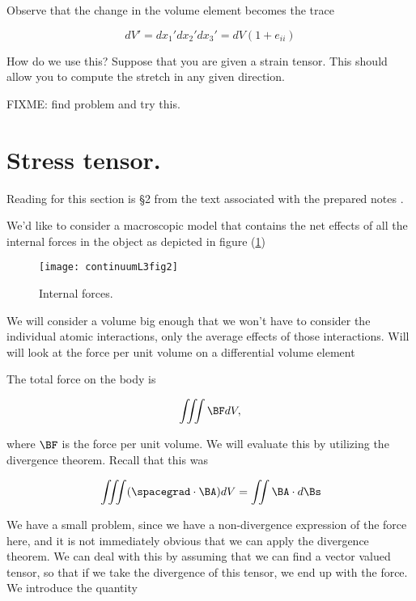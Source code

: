 Observe that the change in the volume element becomes the trace

\begin{equation}\label{eqn:continuumL3:210}
dV' = 
dx_1'
dx_2'
dx_3'
= dV(1 + e_{ii})
\end{equation}

How do we use this?  Suppose that you are given a strain tensor.  This should allow you to compute the stretch in any given direction.

FIXME: find problem and try this.

\section{Stress tensor.}

Reading for this section is \S 2 from the text associated with the prepared notes \cite{landau1960theory}.

We'd like to consider a macroscopic model that contains the net effects of all the internal forces in the object as depicted in figure (\ref{fig:continuumL3:continuumL3fig2})

\begin{figure}[htp]
   \centering
   \texttt{[image: continuumL3fig2]}
   \caption{Internal forces.}\label{fig:continuumL3:continuumL3fig2}
\end{figure}

We will consider a volume big enough that we won't have to consider the individual atomic interactions, only the average effects of those interactions.  Will will look at the force per unit volume on a differential volume element

The total force on the body is 

\begin{equation}\label{eqn:continuumL3:230}
\iiint \BF dV,
\end{equation}

where $\BF$ is the force per unit volume.  We will evaluate this by utilizing the divergence theorem.  Recall that this was

\begin{equation}\label{eqn:continuumL3:250}
\iiint (\spacegrad \cdot \BA) dV
= \iint \BA \cdot d\Bs
\end{equation}

We have a small problem, since we have a non-divergence expression of the force here, and it is not immediately obvious that we can apply the divergence theorem.  We can deal with this by assuming that we can find a vector valued tensor, so that if we take the divergence of this tensor, we end up with the force.  We introduce the quantity

